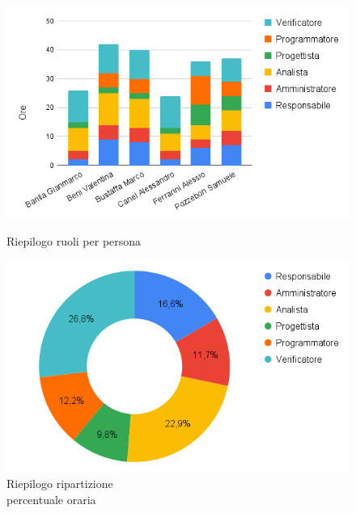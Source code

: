 \begin{figure}[h!]
	\centering
	\begin{minipage}[c]{0.42\textwidth}
    	\includegraphics[scale=0.42]{../../assets/Diagrammi_Excel/person_tot.png}
		\caption{Riepilogo ruoli per persona}
	\end{minipage}
\hfill
	\begin{minipage}[c]{0.46\textwidth}
		\includegraphics[scale=0.38]{../../assets/Diagrammi_Excel/torta_tot.png}
		\caption{Riepilogo ripartizione\\ percentuale oraria}
	\end{minipage}
\end{figure}

\setlength\extrarowheight{0pt}



